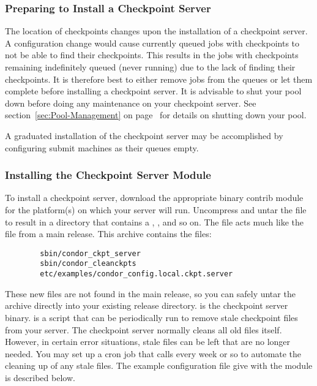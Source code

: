 \subsubsection{\label{sec:Prepare-Ckpt-Server}
Preparing to Install a Checkpoint Server} 

The location of checkpoints changes upon the installation
of a checkpoint server.
A configuration change would cause 
currently queued jobs with checkpoints
to not be able to find their checkpoints.
This results in the jobs with checkpoints
remaining indefinitely queued (never running)
due to the lack of finding their checkpoints.
It is therefore best to 
either remove jobs from the queues or let them complete
before installing a checkpoint server.
It is advisable to shut your pool down before doing any
maintenance on your checkpoint server.  
See section~\ref{sec:Pool-Management} on
page~\pageref{sec:Pool-Management} for details on shutting
down your pool. 

A graduated installation of the checkpoint server may be
accomplished by 
configuring submit machines as their queues empty.

\subsubsection{\label{sec:Install-Ckpt-Server-Module}
Installing the Checkpoint Server Module} 

To install a checkpoint server, download the appropriate binary
contrib module for the platform(s) on which your server will run.
Uncompress and untar the file to result in a directory that
contains a , , and so on.
The file  acts much like the  file
from a main release.
This archive contains the files:
\begin{verbatim}
        sbin/condor_ckpt_server
        sbin/condor_cleanckpts
        etc/examples/condor_config.local.ckpt.server
\end{verbatim}
These new files are not found in the main release, so you can
safely untar the archive directly into your existing release
directory. 
 is the checkpoint server binary.
 is a script that can be periodically run to
remove stale checkpoint files from your server.  
The checkpoint server normally cleans all old files itself.  
However, in certain error situations, stale files can be left that are
no longer needed.
You may set up a cron job that calls
 every week or so to automate the cleaning up
of any
stale files.
The example configuration file give with the module
is described below.

